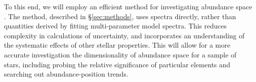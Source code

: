 \documentclass[preprint]{aastex}
\begin{document}
To this end, we will employ an efficient method for investigating abundance space \citep{openclusters}. The method, described in \S\ref{sec:methods}, uses spectra directly, rather than quantities derived by fitting multi-parameter model spectra. This reduces complexity in calculations of uncertainty, and incorporates an understanding of the systematic effects of other stellar properties. This will allow for a more accurate investigation the dimensionality of abundance space for a sample of stars, including probing the relative significance of particular elements and searching out abundance-position trends.

 



\end{document}
